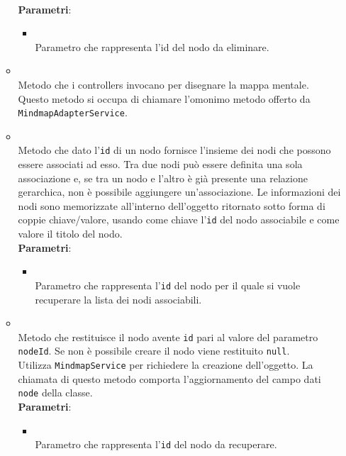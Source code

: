 \begin{itemize}
\begin{itemize}
\dpReturnPromiseNoValue
\\ \textbf{Parametri}:
\begin{itemize}
\item {}
\\ Parametro che rappresenta l'id del nodo da eliminare.
\end{itemize}
\item {}
\\ Metodo che i controllers invocano per disegnare la mappa mentale. Questo metodo si occupa di chiamare l'omonimo metodo offerto da \texttt{MindmapAdapterService}. \dpReturnPromiseNoValue
\item {}
\\ Metodo che dato l'\texttt{id} di un nodo fornisce l'insieme dei nodi che possono essere associati ad esso. Tra due nodi può essere definita una sola associazione e, se tra un nodo e l'altro è già presente una relazione gerarchica, non è possibile aggiungere un'associazione. Le informazioni dei nodi sono memorizzate all'interno dell'oggetto ritornato sotto forma di coppie chiave/valore, usando come chiave l'\texttt{id} del nodo associabile e come valore il titolo del nodo.
\\ \textbf{Parametri}:
\begin{itemize}
\item {}
\\ Parametro che rappresenta l'\texttt{id} del nodo per il quale si vuole recuperare la lista dei nodi associabili.
\end{itemize}
\item {}
\\ Metodo che restituisce il nodo avente \texttt{id} pari al valore del parametro \texttt{nodeId}. Se non è possibile creare il nodo viene restituito \texttt{null}.\\
Utilizza \texttt{MindmapService} per richiedere la creazione dell'oggetto. La chiamata di questo metodo comporta l'aggiornamento del campo dati \texttt{node} della classe.
\\ \textbf{Parametri}:
\begin{itemize}
\item {}
\\ Parametro che rappresenta l'\texttt{id} del nodo da recuperare.
\end{itemize}

\end{itemize}
\end{itemize}
